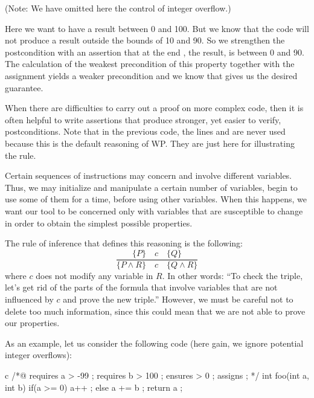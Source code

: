 (Note: We have omitted here the control of integer overflow.)



Here we want to have a result between 0 and 100. But we know that the
code will not produce a result outside the bounds of 10 and 90. So we
strengthen the postcondition with an assertion that at the end
, the result, is between 0 and 90. The calculation of the
weakest precondition of this property together with the assignment
 yields a weaker precondition
 and we know that
 gives us the desired
guarantee.



When there are difficulties to carry out a proof on more complex code,
then it is often helpful to write assertions that produce stronger, yet
easier to verify, postconditions. Note that in the previous code, the
lines  and are never used
because this is the default reasoning of WP. They are just here for
illustrating the rule.


\label{l3:statements-basic-constancy}


Certain sequences of instructions may concern and involve different
variables. Thus, we may initialize and manipulate a certain number of
variables, begin to use some of them for a time, before using other
variables. When this happens, we want our tool to be concerned only with
variables that are susceptible to change in order to obtain the simplest
possible properties.



The rule of inference that defines this reasoning is the following:
$$\dfrac{\{P\}\quad c\quad \{Q\}}{\{P \wedge R\}\quad c\quad \{Q \wedge R\}}$$
where $c$ does not modify any variable in $R$. In other words:
``To check the triple, let's get rid of the parts of the formula that
involve variables that are not influenced by $c$ and prove the new
triple.'' However, we must be careful not to delete too much
information, since this could mean that we are not able to prove our
properties.


As an example, let us consider the following code (here gain, we ignore
potential integer overflows):



\begin{CodeBlock}{c}
/*@
  requires a > -99 ;
  requires b > 100 ;
  ensures  \result > 0 ;
  assigns  \nothing ;
*/
int foo(int a, int b){
  if(a >= 0){
    a++ ;
  } else {
    a += b ;
  }
  return a ;
}
\end{CodeBlock}


